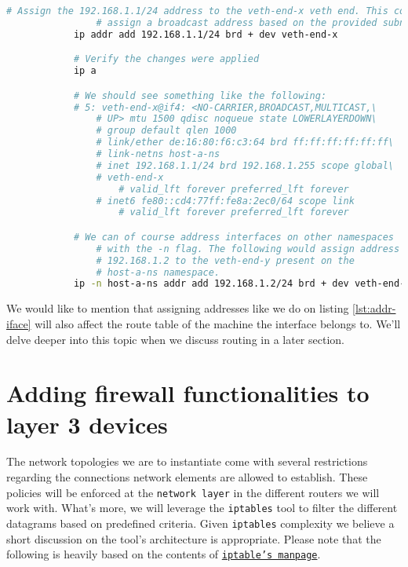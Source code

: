         \begin{lstlisting}[language = bash, caption = Addressing an inetrface., label = lst:addr-iface]
            # Assign the 192.168.1.1/24 address to the veth-end-x veth end. This command will automatically
                # assign a broadcast address based on the provided subnet mask (i.e. /24)
            ip addr add 192.168.1.1/24 brd + dev veth-end-x

            # Verify the changes were applied
            ip a

            # We should see something like the following:
            # 5: veth-end-x@if4: <NO-CARRIER,BROADCAST,MULTICAST,\
                # UP> mtu 1500 qdisc noqueue state LOWERLAYERDOWN\
                # group default qlen 1000
                # link/ether de:16:80:f6:c3:64 brd ff:ff:ff:ff:ff:ff\
                # link-netns host-a-ns
                # inet 192.168.1.1/24 brd 192.168.1.255 scope global\
                # veth-end-x
                    # valid_lft forever preferred_lft forever
                # inet6 fe80::cd4:77ff:fe8a:2ec0/64 scope link
                    # valid_lft forever preferred_lft forever

            # We can of course address interfaces on other namespaces
                # with the -n flag. The following would assign address
                # 192.168.1.2 to the veth-end-y present on the
                # host-a-ns namespace.
            ip -n host-a-ns addr add 192.168.1.2/24 brd + dev veth-end-y
        \end{lstlisting}

        We would like to mention that assigning addresses like we do on listing \ref{lst:addr-iface} will also affect the route table of the machine the interface belongs to. We'll delve deeper into this topic when we discuss routing in a later section.

    \section{Adding firewall functionalities to layer 3 devices}
        The network topologies we are to instantiate come with several restrictions regarding the connections network elements are allowed to establish. These policies will be enforced at the \texttt{network layer} in the different routers we will work with. What's more, we will leverage the \texttt{iptables} tool to filter the different datagrams based on predefined criteria. Given \texttt{iptables} complexity we believe a short discussion on the tool's architecture is appropriate. Please note that the following is heavily based on the contents of \href{https://linux.die.net/man/8/iptables}{\texttt{iptable's manpage}}.

